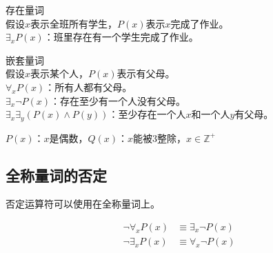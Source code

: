 \documentclass[12pt, openany, oneside]{book}
\begin{document}
\begin{tcolorbox}
    存在量词 \\
    假设$ x $表示全班所有学生，$ P(x) $表示$ x $完成了作业。 \\
    $ \exists_x P(x) $：班里存在有一个学生完成了作业。
\end{tcolorbox}

\begin{tcolorbox}
    嵌套量词 \\
    假设$ x $表示某个人，$ P(x) $表示有父母。 \\
    $ \forall_x P(x) $：所有人都有父母。 \\
    $ \exists_x \neg P(x) $：存在至少有一个人没有父母。 \\
    $ \exists_x \exists_y (P(x) \wedge P(y)) $：至少存在一个人$ x $和一个人$ y $有父母。
\end{tcolorbox}

\begin{tcolorbox}
    $ P(x) $：$ x $是偶数，$ Q(x) $：$ x $能被3整除，$ x \in \mathbb{Z}^+ $
    \begin{table}[H]
        \centering
    \end{table}
\end{tcolorbox}

\subsection{全称量词的否定}

否定运算符可以使用在全称量词上。

\begin{align}
    \neg \forall_x P(x) & \equiv \exists_x \neg P(x) \\
    \neg \exists_x P(x) & \equiv \forall_x \neg P(x)
\end{align}
\end{document}
